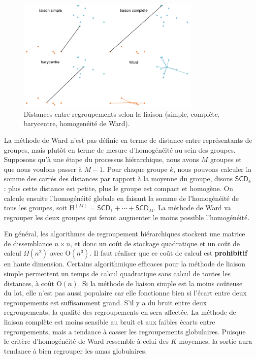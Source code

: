 \documentclass[
  11pt,
  letterpaper,
]{scrbook}
\theoremstyle{definition}
\theoremstyle{remark}
\begin{document}
\begin{figure}[ht!]

{\centering \includegraphics[width=0.8\textwidth,height=\textheight]{regroupements_files/figure-pdf/fig-distances-1.pdf}

}

\caption{\label{fig-distances}Distances entre regroupements selon la
liaison (simple, complète, barycentre, homogenéité de Ward).}

\end{figure}

La méthode de Ward n'est pas définie en terme de distance entre
représentants de groupes, mais plutôt en terme de mesure d'homogénéité
au sein des groupes. Supposons qu'à une étape du processus hiérarchique,
nous avons \(M\) groupes et que nous voulons passer à \(M-1\). Pour
chaque groupe \(k\), nous pouvons calculer la somme des carrés des
distances par rapport à la moyenne du groupe, disons \(\mathsf{SCD}_k\):
plus cette distance est petite, plus le groupe est compact et homogène.
On calcule ensuite l'homogénéité globale en faisant la somme de
l'homogénéité de tous les groupes, soit
\(\mathrm{H}^{(M)} = \mathsf{SCD}_1 + \cdots + \mathsf{SCD}_M\). La
méthode de Ward va regrouper les deux groupes qui feront augmenter le
moins possible l'homogénéité.

En général, les algorithmes de regroupement hiérarchiques stockent une
matrice de dissemblance \(n \times n\), et donc un coût de stockage
quadratique et un coût de calcul \(\Omega(n^2)\) avec
\(\mathrm{O}(n^3)\). Il faut réaliser que ce coût de calcul est
\textbf{prohibitif} en haute dimension. Certains algorithmique efficaces
pour la méthode de liaison simple permettent un temps de calcul
quadratique sans calcul de toutes les distances, à coût
\(\mathrm{O}(n)\). Si la méthode de liaison simple est la moins coûteuse
du lot, elle n'est pas aussi populaire car elle fonctionne bien si
l'écart entre deux regroupements est suffisamment grand. S'il y a du
bruit entre deux regroupements, la qualité des regroupements en sera
affectée. La méthode de liaison complète est moins sensible au bruit et
aux faibles écarts entre regroupements, mais a tendance à casser les
regroupements globulaires. Puisque le critère d'homogénéité de Ward
ressemble à celui des \(K\)-moyennes, la sortie aura tendance à bien
regrouper les amas globulaires.
\end{document}
